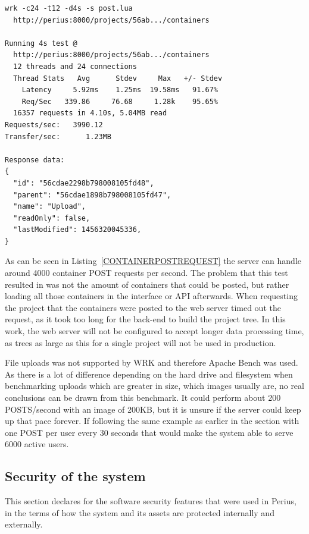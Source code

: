 \documentclass[a4paper,12pt]{article}
\begin{document}
\begin{minipage}{\linewidth-1cm}
\begin{lstlisting}[label=CONTAINERPOSTREQUEST,caption=Result of container creation]
wrk -c24 -t12 -d4s -s post.lua 
  http://perius:8000/projects/56ab.../containers 
  
Running 4s test @ 
  http://perius:8000/projects/56ab.../containers
  12 threads and 24 connections
  Thread Stats   Avg      Stdev     Max   +/- Stdev
    Latency     5.92ms    1.25ms  19.58ms   91.67%
    Req/Sec   339.86     76.68     1.28k    95.65%
  16357 requests in 4.10s, 5.04MB read
Requests/sec:   3990.12
Transfer/sec:      1.23MB

Response data:
{
  "id": "56cdae2298b798008105fd48",
  "parent": "56cdae1898b798008105fd47",
  "name": "Upload",
  "readOnly": false,
  "lastModified": 1456320045336,
}
\end{lstlisting}
\end{minipage}

As can be seen in Listing~\ref{CONTAINERPOSTREQUEST} the server can handle around 4000 container
POST requests per second. The problem that this test resulted in was not the amount of containers
that could be posted, but rather loading all those containers in the interface or API afterwards.
When requesting the project that the containers were posted to the web server timed out the request,
as it took too long for the back-end to build the project tree. In this work, the web server will
not  
be configured to accept longer data processing time, as trees as large as this for a single project
will not be used in production.

\par
File uploads was not supported by WRK and therefore Apache Bench was used. As there is a lot of
difference depending on the hard drive and filesystem when benchmarking uploads which are greater in
size, which images usually are, no real conclusions can be drawn from this benchmark. It could
perform about 200 POSTS/second with an image of 200KB, but it is unsure if the server could keep up
that pace forever. If following the same example as earlier in the section with one POST per user
every 30 seconds that would make the system able to serve 6000 active users.

\newpage
\subsection{Security of the system}
This section declares for the software security features that were used in Perius, in the terms of
how the system and its assets are protected internally and externally.
\end{document}
